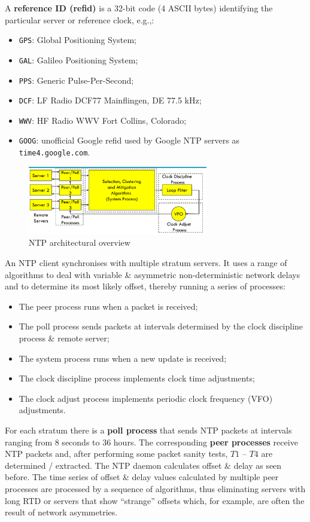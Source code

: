 \documentclass[a4paper,11pt]{article}
\begin{document}
A \textbf{reference ID (refid)} is a 32-bit code (4 ASCII bytes) identifying the particular server or reference clock, e.g.,:
\begin{itemize}
    \item   \verb|GPS|: Global Positioning System;
    \item   \verb|GAL|: Galileo Positioning System;
    \item   \verb|PPS|: Generic Pulse-Per-Second;
    \item   \verb|DCF|: LF Radio DCF77 Mainflingen, DE 77.5 kHz;
    \item   \verb|WWV|: HF Radio WWV Fort Collins, Colorado;
    \item   \verb|GOOG|: unofficial Google refid used by Google NTP servers as \verb|time4.google.com|.
\end{itemize}

\begin{figure}[H]
    \centering
    \includegraphics[width=0.7\textwidth]{./images/ntparchitecuraloverview.png}
    \caption{ NTP architectural overview }
\end{figure}

An NTP client synchronises with multiple stratum servers.
It uses a range of algorithms to deal with variable \& asymmetric non-deterministic network delays and to determine its most likely offset, thereby running a series of processes:
\begin{itemize}
    \item   The peer process runs when a packet is received;
    \item   The poll process sends packets at intervals determined by the clock discipline process \& remote server;
    \item   The system process runs when a new update is received;
    \item   The clock discipline process implements clock time adjustments;
    \item   The clock adjust process implements periodic clock frequency (VFO) adjustments.
\end{itemize}

For each stratum there is a \textbf{poll process} that sends NTP packets at intervals ranging from 8 seconds to 36 hours.
The corresponding \textbf{peer processes} receive NTP packets and, after performing some packet sanity tests, $T1$ – $T4$ are determined / extracted.
The NTP daemon calculates offset \& delay as seen before.
The time series of offset \& delay values calculated by multiple peer processes are processed by a sequence of algorithms, thus eliminating servers with long RTD or servers that show ``strange'' offsets which, for example, are often the result of network asymmetries.
\end{document}
